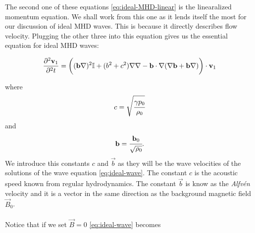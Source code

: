 {\centering 
\noindent {}
\par}

The second one of these equations \autoref{eq:ideal-MHD-linear} is the linearalized momentum equation. We shall work from this one as it lends itself the most for our discussion of ideal MHD waves. This is because it directly describes flow velocity. Plugging the other three into this equation gives us the essential equation for ideal MHD waves:

\begin{equation}
	\label{eq:ideal-wave}		
		\frac{\partial^2 \vec{v}_1}{\partial^2 t} = \bigg( (\vec{b} \nabla)^2 \I + (b^2 + c^2)\nabla \nabla - \vec{b} \cdot \nabla (\nabla \vec{b} + \vec{b} \nabla) \bigg) \cdot \vec{v}_1
\end{equation}

where
\begin{equation}
c = \sqrt{\cfrac{\gamma p_0}{\rho_0}}
\label{eq:acoustic-speed}
\end{equation}
and
\begin{equation}
\vec{b} = \cfrac{\vec{b}_0}{\sqrt{\rho_0}}.
\label{eq:Alfven-speed}
\end{equation}
We introduce this constants $c$ and $\vec{b}$ as they will be the wave velocities of the solutions of the wave equation \autoref{eq:ideal-wave}. The constant $c$ is the acoustic speed known from regular hydrodynamics. The constant $\vec{b}$ is know as the \textit{Alfvén } velocity and it is a vector in the same direction as the background magnetic field $\vec{B}_0$.\\
\\
Notice that if we set $\vec{B} = 0$ \autoref{eq:ideal-wave} becomes

